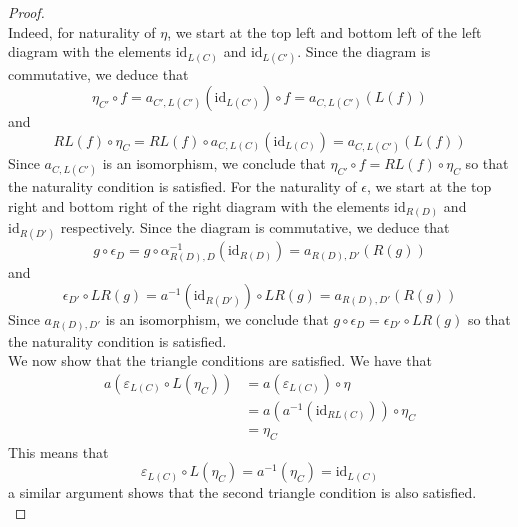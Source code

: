 \documentclass[a4paper]{article}
\begin{document}
\begin{prp}{}{}
\begin{proof}
{} \\
Indeed, for naturality of $\eta$, we start at the top left and bottom left of the left diagram with the elements $\text{id}_{L(C)}$ and $\text{id}_{L(C')}$. Since the diagram is commutative, we deduce that $$\eta_{C'}\circ f=a_{C',L(C')}(\text{id}_{L(C')})\circ f=a_{C,L(C')}(L(f))$$ and $$RL(f)\circ\eta_C=RL(f)\circ a_{C,L(C)}(\text{id}_{L(C)})=a_{C,L(C')}(L(f))$$ Since $a_{C,L(C')}$ is an isomorphism, we conclude that $\eta_{C'}\circ f=RL(f)\circ\eta_C$ so that the naturality condition is satisfied. For the naturality of $\epsilon$, we start at the top right and bottom right of the right diagram with the elements $\text{id}_{R(D)}$ and $\text{id}_{R(D')}$ respectively. Since the diagram is commutative, we deduce that $$g\circ\epsilon_D=g\circ\alpha_{R(D),D}^{-1}(\text{id}_{R(D)})=a_{R(D),D'}(R(g))$$ and $$\epsilon_{D'}\circ LR(g)=a^{-1}(\text{id}_{R(D')})\circ LR(g)=a_{R(D),D'}(R(g))$$ Since $a_{R(D),D'}$ is an isomorphism, we conclude that $g\circ\epsilon_D=\epsilon_{D'}\circ LR(g)$ so that the naturality condition is satisfied. \\

We now show that the triangle conditions are satisfied. We have that 
\begin{align*}
a(\varepsilon_{L(C)}\circ L(\eta_C))&=a(\varepsilon_{L(C)})\circ\eta\tag{Naturality of $a$}\\
&=a(a^{-1}(\text{id}_{RL(C)}))\circ\eta_C\\
&=\eta_C
\end{align*}
This means that $$\varepsilon_{L(C)}\circ L(\eta_C)=a^{-1}(\eta_C)=\text{id}_{L(C)}$$ a similar argument shows that the second triangle condition is also satisfied. \\


\end{proof}
\end{prp}
\end{document}
